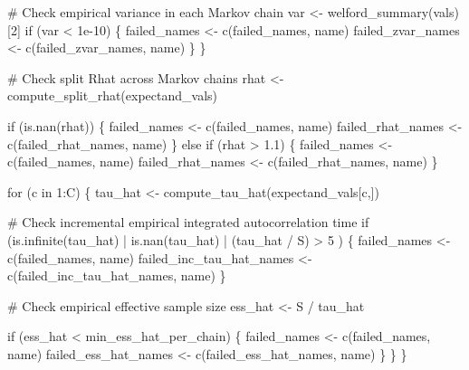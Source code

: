 \documentclass[
  letterpaper,
  DIV=11,
  numbers=noendperiod]{scrartcl}
\newenvironment{Shaded}{\begin{snugshade}}{\end{snugshade}}
\newcommand{\CommentTok}[1]{\textcolor[rgb]{0.37,0.37,0.37}{#1}}
\newcommand{\ControlFlowTok}[1]{\textcolor[rgb]{0.00,0.23,0.31}{#1}}
\newcommand{\DecValTok}[1]{\textcolor[rgb]{0.68,0.00,0.00}{#1}}
\newcommand{\FloatTok}[1]{\textcolor[rgb]{0.68,0.00,0.00}{#1}}
\newcommand{\KeywordTok}[1]{\textcolor[rgb]{0.00,0.23,0.31}{#1}}
\newcommand{\NormalTok}[1]{\textcolor[rgb]{0.00,0.23,0.31}{#1}}
\newcommand{\OperatorTok}[1]{\textcolor[rgb]{0.37,0.37,0.37}{#1}}
\begin{document}
\begin{Shaded}
\begin{Highlighting}[]
      \CommentTok{\# Check empirical variance in each Markov chain}
\NormalTok{      var }\OperatorTok{\textless{}{-}}\NormalTok{ welford\_summary(vals)[}\DecValTok{2}\NormalTok{]}
      \ControlFlowTok{if}\NormalTok{ (var }\OperatorTok{\textless{}} \FloatTok{1e{-}10}\NormalTok{) \{}
\NormalTok{        failed\_names }\OperatorTok{\textless{}{-}}\NormalTok{ c(failed\_names, name)}
\NormalTok{        failed\_zvar\_names }\OperatorTok{\textless{}{-}}\NormalTok{ c(failed\_zvar\_names, name) }
\NormalTok{      \}}
\NormalTok{    \}}

    \CommentTok{\# Check split Rhat across Markov chains}
\NormalTok{    rhat }\OperatorTok{\textless{}{-}}\NormalTok{ compute\_split\_rhat(expectand\_vals)}

    \ControlFlowTok{if}\NormalTok{ (}\KeywordTok{is}\NormalTok{.nan(rhat)) \{}
\NormalTok{      failed\_names }\OperatorTok{\textless{}{-}}\NormalTok{ c(failed\_names, name)}
\NormalTok{      failed\_rhat\_names }\OperatorTok{\textless{}{-}}\NormalTok{ c(failed\_rhat\_names, name)}
\NormalTok{    \} }\ControlFlowTok{else} \ControlFlowTok{if}\NormalTok{ (rhat }\OperatorTok{\textgreater{}} \FloatTok{1.1}\NormalTok{) \{}
\NormalTok{      failed\_names }\OperatorTok{\textless{}{-}}\NormalTok{ c(failed\_names, name)}
\NormalTok{      failed\_rhat\_names }\OperatorTok{\textless{}{-}}\NormalTok{ c(failed\_rhat\_names, name)}
\NormalTok{    \}}

    \ControlFlowTok{for}\NormalTok{ (c }\KeywordTok{in} \DecValTok{1}\NormalTok{:C) \{}
\NormalTok{      tau\_hat }\OperatorTok{\textless{}{-}}\NormalTok{ compute\_tau\_hat(expectand\_vals[c,])}

      \CommentTok{\# Check incremental empirical integrated autocorrelation time}
      \ControlFlowTok{if}\NormalTok{ (}\KeywordTok{is}\NormalTok{.infinite(tau\_hat) }\OperatorTok{|}
          \KeywordTok{is}\NormalTok{.nan(tau\_hat)      }\OperatorTok{|}
\NormalTok{          (tau\_hat }\OperatorTok{/}\NormalTok{ S) }\OperatorTok{\textgreater{}} \DecValTok{5}\NormalTok{      ) \{}
\NormalTok{        failed\_names }\OperatorTok{\textless{}{-}}\NormalTok{ c(failed\_names, name)}
\NormalTok{        failed\_inc\_tau\_hat\_names }\OperatorTok{\textless{}{-}}\NormalTok{ c(failed\_inc\_tau\_hat\_names, name)}
\NormalTok{      \}}

      \CommentTok{\# Check empirical effective sample size}
\NormalTok{      ess\_hat }\OperatorTok{\textless{}{-}}\NormalTok{ S }\OperatorTok{/}\NormalTok{ tau\_hat}
      
      \ControlFlowTok{if}\NormalTok{ (ess\_hat }\OperatorTok{\textless{}}\NormalTok{ min\_ess\_hat\_per\_chain) \{}
\NormalTok{        failed\_names }\OperatorTok{\textless{}{-}}\NormalTok{ c(failed\_names, name)}
\NormalTok{        failed\_ess\_hat\_names }\OperatorTok{\textless{}{-}}\NormalTok{ c(failed\_ess\_hat\_names, name)}
\NormalTok{      \}}
\NormalTok{    \}}
\NormalTok{  \}}
  

\end{Highlighting}
\end{Shaded}
\end{document}
